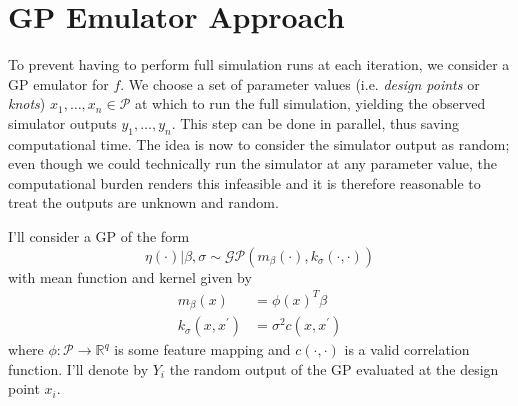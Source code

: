 \documentclass[12pt]{article}
\newcommand{\R}{\mathcal{R}}
\def\R{\mathbb{R}}
\begin{document}
\section{GP Emulator Approach}
To prevent having to perform full simulation runs at each iteration, we consider a GP emulator for $f$. We choose a set of parameter values (i.e. \textit{design points} or \textit{knots}) $x_1, \dots, x_n \in \mathcal{P}$ at which to run the full simulation, yielding the observed simulator outputs $y_1, \dots, y_n$. This step can be done in parallel, 
thus saving computational time. The idea is now to consider the simulator output as random; even though we could technically run the simulator at any parameter value, the 
computational burden renders this infeasible and it is therefore reasonable to treat the outputs are unknown and random. 


I'll consider a GP of the form 
\[\eta(\cdot)|\beta, \sigma \sim \mathcal{GP}(m_\beta(\cdot), k_\sigma(\cdot, \cdot))\]
with mean function and kernel given by 
\begin{align*}
m_\beta(x) &= \phi(x)^T \beta \\
k_{\sigma}(x, x^\prime) &= \sigma^2 c(x, x^\prime)
\end{align*}
where $\phi: \mathcal{P} \to \R^q$ is some feature mapping and $c(\cdot, \cdot)$ is a valid correlation function. I'll denote by $Y_i$ the random output of the GP evaluated at the design point $x_i$. 
\end{document}
